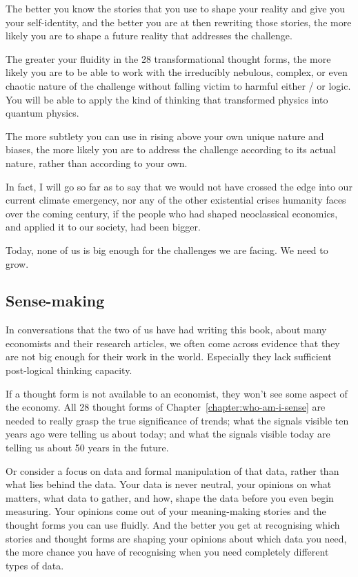 The better you know the stories  that you use to shape your reality and give you your self-identity, and the better you are at then rewriting those stories, the more likely you are to shape a future reality that addresses the challenge.


The greater your fluidity in the 28 transformational thought forms,  the more likely you are to be able to work with the irreducibly nebulous, complex, or even chaotic nature of the challenge without falling victim to harmful either / or logic. You will be able to apply the kind of thinking that transformed physics into quantum physics. 


The more subtlety you can use in rising above your own unique nature and biases, the more likely you are to address the challenge according to its actual nature, rather than according to your own.


In fact, I will go so far as to say that we would not have crossed the edge into our current climate emergency, nor any of the other existential crises humanity faces over the coming century, if the people who had shaped neoclassical economics,  and applied it to our society, had been bigger. 


Today, none of us is big enough for the challenges we are facing. We need to grow.


\subsection{Sense-making}
In conversations that the two of us have had writing this book, about many economists and their research articles, we often come across evidence that they are not big enough for their work in the world. Especially they lack sufficient post-logical thinking capacity. 


If a thought form is not available to an economist, they won't see some aspect of the economy. All 28 thought forms of Chapter~\ref{chapter:who-am-i-sense} are  needed to really grasp the true significance of trends; what the signals visible ten years ago were telling us about today; and what the signals visible today are telling us about 50 years in the future.


Or consider a focus on data and formal manipulation of that data, rather than what lies behind the data. Your data is never neutral, your opinions on what matters, what data to gather, and how, shape the data before you even begin measuring. Your opinions come out of your meaning\hyp{}making stories  and the thought forms you can use fluidly. And the better you get at recognising which stories and thought forms are shaping your opinions about which data you need, the more chance you have of recognising when you need completely different types of data. 


